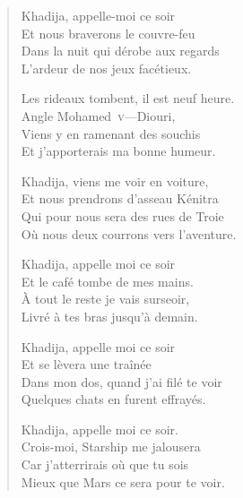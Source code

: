 \begin{verse}
Khadija, appelle-moi ce soir\\
Et nous braverons le couvre-feu\\
Dans la nuit qui dérobe aux regards\\
L’ardeur de nos jeux facétieux.

Les rideaux tombent, il est neuf heure.\\
Angle Mohamed~\textsc{v}—Diouri,\\
Viens y en ramenant des souchis\\
Et j’apporterais ma bonne humeur.

Khadija, viens me voir en voiture,\\
Et nous prendrons d’asseau Kénitra\\
Qui pour nous sera des rues de Troie\\
Où nous deux courrons vers l’aventure.

Khadija, appelle moi ce soir\\
Et le  café tombe de mes mains.\\
À tout le reste je vais surseoir,\\
Livré à tes bras jusqu’à demain.

Khadija, appelle moi ce soir\\
Et se lèvera une traînée\\
Dans mon dos, quand j’ai filé te voir\\
Quelques chats en furent effrayés.

Khadija, appelle moi ce soir.\\
Crois-moi, Starship me jalousera\\
Car j’atterrirais où que tu sois\\
Mieux que Mars ce sera pour te voir.
\end{verse}

